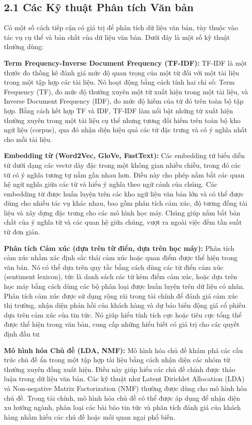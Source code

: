 \subsection{2.1 Các Kỹ thuật Phân tích Văn bản}

Có một số cách tiếp cận có giá trị để phân tích dữ liệu văn bản, tùy thuộc vào tác vụ cụ thể và bản chất của dữ liệu văn bản. Dưới đây là một số kỹ thuật thường dùng:

\textbf{Term Frequency-Inverse Document Frequency (TF-IDF):} TF-IDF là một thước đo thống kê đánh giá mức độ quan trọng của một từ đối với một tài liệu trong một tập hợp các tài liệu. Nó hoạt động bằng cách tính hai chỉ số: Term Frequency (TF), đo mức độ thường xuyên một từ xuất hiện trong một tài liệu, và Inverse Document Frequency (IDF), đo mức độ hiếm của từ đó trên toàn bộ tập hợp. Bằng cách kết hợp TF và IDF, TF-IDF làm nổi bật những từ xuất hiện thường xuyên trong một tài liệu cụ thể nhưng tương đối hiếm trên toàn bộ kho ngữ liệu (corpus), qua đó nhận diện hiệu quả các từ đặc trưng và có ý nghĩa nhất cho mỗi tài liệu.

\textbf{Embedding từ (Word2Vec, GloVe, FastText):} Các embedding từ biểu diễn từ dưới dạng các vectơ dày đặc trong một không gian nhiều chiều, trong đó các từ có ý nghĩa tương tự nằm gần nhau hơn. Điều này cho phép nắm bắt các quan hệ ngữ nghĩa giữa các từ và hiểu ý nghĩa theo ngữ cảnh của chúng. Các embedding từ được huấn luyện trên các kho ngữ liệu văn bản lớn và có thể được dùng cho nhiều tác vụ khác nhau, bao gồm phân tích cảm xúc, độ tương đồng tài liệu và xây dựng đặc trưng cho các mô hình học máy. Chúng giúp nắm bắt bản chất của ý nghĩa từ và các quan hệ giữa chúng, vượt ra ngoài việc đếm tần suất từ đơn giản.

\textbf{Phân tích Cảm xúc (dựa trên từ điển, dựa trên học máy):} Phân tích cảm xúc nhằm xác định sắc thái cảm xúc hoặc quan điểm được thể hiện trong văn bản. Nó có thể dựa trên quy tắc bằng cách dùng các từ điển cảm xúc (sentiment lexicon), tức là danh sách các từ kèm điểm cảm xúc, hoặc dựa trên học máy bằng cách dùng các bộ phân loại được huấn luyện trên dữ liệu có nhãn. Phân tích cảm xúc được sử dụng rộng rãi trong tài chính để đánh giá cảm xúc thị trường, nhận diện phản hồi của khách hàng và dự báo biến động giá cổ phiếu dựa trên cảm xúc của tin tức. Nó giúp hiểu tính tích cực hoặc tiêu cực tổng thể được thể hiện trong văn bản, cung cấp những hiểu biết có giá trị cho các quyết định đầu tư.

\textbf{Mô hình hóa Chủ đề (LDA, NMF):} Mô hình hóa chủ đề khám phá các cấu trúc chủ đề ẩn trong một tập hợp tài liệu bằng cách nhận diện các nhóm từ thường xuyên đồng xuất hiện. Điều này giúp hiểu các chủ đề chính được thảo luận trong dữ liệu văn bản. Các kỹ thuật như Latent Dirichlet Allocation (LDA) và Non-negative Matrix Factorization (NMF) thường được dùng cho mô hình hóa chủ đề. Trong tài chính, mô hình hóa chủ đề có thể được áp dụng để nhận diện xu hướng ngành, phân loại các bài báo tin tức và phân tích đánh giá của khách hàng nhằm hiểu các chủ đề hoặc mối quan ngại phổ biến.

